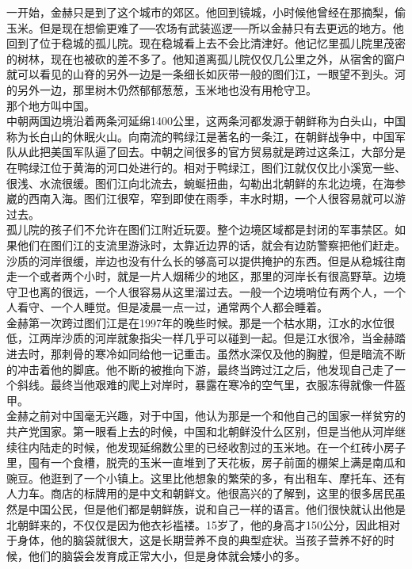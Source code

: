 一开始，金赫只是到了这个城市的郊区。他回到镜城，小时候他曾经在那摘梨，偷玉米。但是现在想偷更难了──农场有武装巡逻──所以金赫只有去更远的地方。他回到了位于稳城的孤儿院。现在稳城看上去不会比清津好。他记忆里孤儿院里茂密的树林，现在也被砍的差不多了。他知道离孤儿院仅仅几公里之外，从宿舍的窗户就可以看见的山脊的另外一边是一条细长如灰带一般的图们江，一眼望不到头。河的另外一边，那里树木仍然郁郁葱葱，玉米地也没有用枪守卫。\\

那个地方叫中国。\\

中朝两国边境沿着两条河延绵1400公里，这两条河都发源于朝鲜称为白头山，中国称为长白山的休眠火山。向南流的鸭绿江是著名的一条江，在朝鲜战争中，中国军队从此把美国军队逼了回去。中朝之间很多的官方贸易就是跨过这条江，大部分是在鸭绿江位于黄海的河口处进行的。相对于鸭绿江，图们江就仅仅比小溪宽一些、很浅、水流很缓。图们江向北流去，蜿蜒扭曲，勾勒出北朝鲜的东北边境，在海参崴的西南入海。图们江很窄，窄到即使在雨季，丰水时期，一个人很容易就可以游过去。\\

孤儿院的孩子们不允许在图们江附近玩耍。整个边境区域都是封闭的军事禁区。如果他们在图们江的支流里游泳时，太靠近边界的话，就会有边防警察把他们赶走。沙质的河岸很缓，岸边也没有什么长的够高可以提供掩护的东西。但是从稳城往南走一个或者两个小时，就是一片人烟稀少的地区，那里的河岸长有很高野草。边境守卫也离的很远，一个人很容易从这里溜过去。一般一个边境哨位有两个人，一个人看守、一个人睡觉。但是凌晨一点一过，通常两个人都会睡着。\\

金赫第一次跨过图们江是在1997年的晚些时候。那是一个枯水期，江水的水位很低，江两岸沙质的河岸就象指尖一样几乎可以碰到一起。但是江水很冷，当金赫踏进去时，那刺骨的寒冷如同给他一记重击。虽然水深仅及他的胸膛，但是暗流不断的冲击着他的脚底。他不断的被推向下游，最终当跨过江之后，他发现自己走了一个斜线。最终当他艰难的爬上对岸时，暴露在寒冷的空气里，衣服冻得就像一件盔甲。\\

金赫之前对中国毫无兴趣，对于中国，他认为那是一个和他自己的国家一样贫穷的共产党国家。第一眼看上去的时候，中国和北朝鲜没什么区别，但是当他从河岸继续往内陆走的时候，他发现延绵数公里的已经收割过的玉米地。在一个红砖小房子里，囤有一个食槽，脱壳的玉米一直堆到了天花板，房子前面的棚架上满是南瓜和豌豆。他逛到了一个小镇上。这里比他想象的繁荣的多，有出租车、摩托车、还有人力车。商店的标牌用的是中文和朝鲜文。他很高兴的了解到，这里的很多居民虽然是中国公民，但是他们都是朝鲜族，说和自己一样的语言。他们很快就认出他是北朝鲜来的，不仅仅是因为他衣衫褴褛。15岁了，他的身高才150公分，因此相对于身体，他的脑袋就很大，这是长期营养不良的典型症状。当孩子营养不好的时候，他们的脑袋会发育成正常大小，但是身体就会矮小的多。\\


